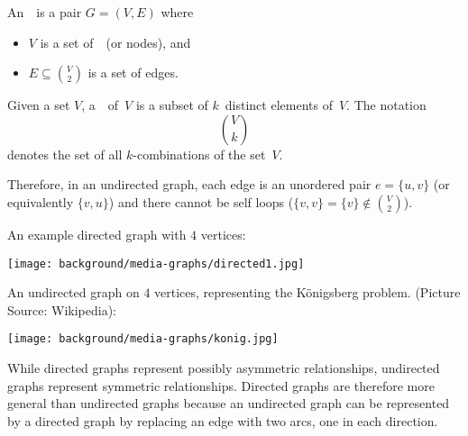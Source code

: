 \begin{cluster}
\label{grp:def:bg::graphs::undirected-graph}

\begin{definition}
\label{def:bg::graphs::undirected-graph}
 An~~is a pair $G = (V,E)$ where
\begin{itemize}
\item  $V$ is a set of~~(or nodes), and
\item  $E \subseteq  \binom{V}{2}$ is a set of edges.
\end{itemize}

\end{definition}
\end{cluster}

\begin{cluster}
\label{grp:nt:bg::graphs::given}

\begin{note}
\label{nt:bg::graphs::given}
Given a set $V$, a~~of~$V$ is a subset of
$k$~distinct elements of~$V$.
The notation 
\[
\binom{V}{k}
\]
denotes the set of all $k$-combinations of the set~$V$. 

Therefore, in an undirected graph, each edge is an unordered pair
$e = \{ u,v \}$ (or equivalently $\{ v,u \}$)
and there cannot be self loops ($\{v,v\} = \{v\} \not\in
\binom{V}{2}$).

\end{note}
\end{cluster}

\begin{cluster}
\label{grp:ex:bg::graphs::basics::examples}

\begin{example}
\label{ex:bg::graphs::basics::examples}
An example directed graph with $4$ vertices:

\texttt{[image: background/media-graphs/directed1.jpg]} 

An undirected graph on $4$ vertices, representing the
  K\"onigsberg problem. (Picture Source: Wikipedia):

\texttt{[image: background/media-graphs/konig.jpg]}

\end{example}
\end{cluster}

\begin{cluster}
\label{grp:rmrk:bg::graphs::directed}

\begin{remark}
\label{rmrk:bg::graphs::directed}
While directed graphs represent possibly asymmetric relationships,
undirected graphs represent symmetric relationships.
Directed graphs are therefore more general than undirected graphs
because an undirected graph can be represented by a directed graph by
replacing an edge with two arcs, one in each direction.

\end{remark}
\end{cluster}

